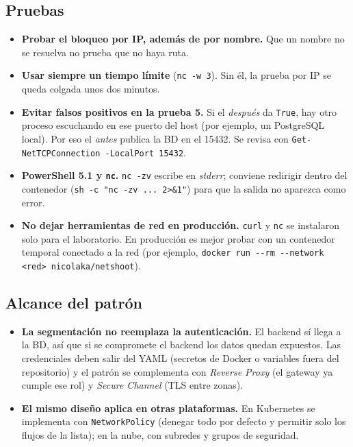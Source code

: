 \documentclass[11pt,letterpaper]{article}
\newcommand{\code}[1]{\texttt{#1}}
\begin{document}
\subsection{Pruebas}

\begin{itemize}
  \item \textbf{Probar el bloqueo por IP, además de por nombre.} Que un nombre no se resuelva no prueba que no haya ruta.
  \item \textbf{Usar siempre un tiempo límite} (\code{nc -w 3}). Sin él, la prueba por IP se queda colgada unos dos minutos.
  \item \textbf{Evitar falsos positivos en la prueba 5.} Si el \emph{después} da \code{True}, hay otro proceso escuchando en ese puerto del host (por ejemplo, un PostgreSQL local). Por eso el \emph{antes} publica la BD en el 15432. Se revisa con \code{Get-NetTCPConnection -LocalPort 15432}.
  \item \textbf{PowerShell 5.1 y \code{nc}.} \code{nc -zv} escribe en \emph{stderr}; conviene redirigir dentro del contenedor (\code{sh -c "nc -zv ... 2>\&1"}) para que la salida no aparezca como error.
  \item \textbf{No dejar herramientas de red en producción.} \code{curl} y \code{nc} se instalaron solo para el laboratorio. En producción es mejor probar con un contenedor temporal conectado a la red (por ejemplo, \code{docker run -{}-rm -{}-network <red> nicolaka/netshoot}).
\end{itemize}

\subsection{Alcance del patrón}

\begin{itemize}
  \item \textbf{La segmentación no reemplaza la autenticación.} El backend sí llega a la BD, así que si se compromete el backend los datos quedan expuestos. Las credenciales deben salir del YAML (secretos de Docker o variables fuera del repositorio) y el patrón se complementa con \emph{Reverse Proxy} (el gateway ya cumple ese rol) y \emph{Secure Channel} (TLS entre zonas).
  \item \textbf{El mismo diseño aplica en otras plataformas.} En Kubernetes se implementa con \code{NetworkPolicy} (denegar todo por defecto y permitir solo los flujos de la lista); en la nube, con subredes y grupos de seguridad.
\end{itemize}
\end{document}
